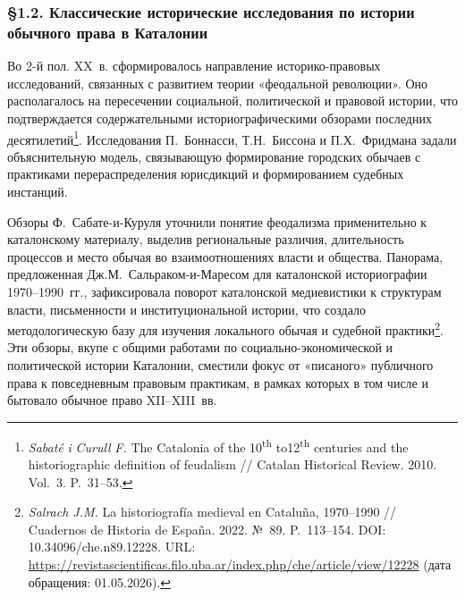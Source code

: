 \subsubsection*{§1.2. Классические исторические исследования по истории обычного права в Каталонии}

Во 2-й пол. XX~в. сформировалось направление историко-правовых исследований, связанных с развитием теории «феодальной революции». Оно располагалось на пересечении социальной, политической и правовой истории, что подтверждается содержательными историографическими обзорами последних десятилетий\footnote{\emph{Sabaté}\emph{ }\emph{i}\emph{ }\emph{Curull}\emph{ F.} The Catalonia of the 10\textsuperscript{th} to12\textsuperscript{th }centuries and the historiographic definition of feudalism // Catalan Historical Review. 2010. Vol.~3. P.~31--53.}. Исследования П.~Боннасси, Т.Н.~Биссона и П.Х.~Фридмана задали объяснительную модель, связывающую формирование городских обычаев с практиками перераспределения юрисдикций и формированием судебных инстанций.

Обзоры Ф.~Сабате-и-Куруля уточнили понятие феодализма применительно к каталонскому материалу, выделив региональные различия, длительность процессов и место обычая во взаимоотношениях власти и общества. Панорама, предложенная Дж.М.~Сальраком-и-Маресом для каталонской историографии 1970--1990~гг., зафиксировала поворот каталонской медиевистики к структурам власти, письменности и институциональной истории, что создало методологическую базу для изучения локального обычая и судебной практики\footnote{\emph{Salrach J.M.} La historiografía medieval en Cataluña, 1970--1990 // Cuadernos de Historia de España. 2022. №~89. P.~113--154. DOI: 10.34096/che.n89.12228. URL: \url{https://revistascientificas.filo.uba.ar/index.php/che/article/view/12228} (дата обращения: 01.05.2026).}. Эти обзоры, вкупе с общими работами по социально-экономической и политической истории Каталонии, сместили фокус от «писаного» публичного права к повседневным правовым практикам, в рамках которых в том числе и бытовало обычное право XII--XIII~вв.

